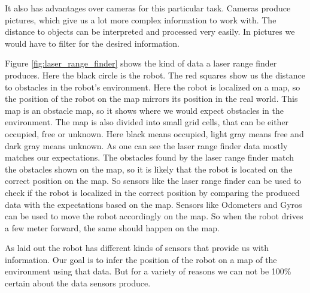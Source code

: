 It also has advantages over cameras for this particular task. Cameras produce pictures, which give us a lot more complex information to work with. The distance to objects can be interpreted and processed very easily. In pictures we would have to filter for the desired information. 

Figure \ref{fig:laser_range_finder} shows the kind of data a laser range finder produces. Here the black circle is the robot. The red squares show us the distance to obstacles in the robot's environment. Here the robot is localized on a map, so the position of the robot on the map mirrors its position in the real world. This map is an obstacle map, so it shows where we would expect obstacles in the environment. The map is also divided into small grid cells, that can be either occupied, free or unknown. Here black means occupied, light gray means free and dark gray means unknown. As one can see the laser range finder data mostly matches our expectations. The obstacles found by the laser range finder match the obstacles shown on the map, so it is likely that the robot is located on the correct position on the map. So sensors like the laser range finder can be used to check if the robot is localized in the correct position by comparing the produced data with the expectations based on the map. Sensors like \glspl{Odometer} and \glspl{Gyro} can be used to move the robot accordingly on the map. So when the robot drives a few meter forward, the same should happen on the map. 

As laid out the robot has different kinds of sensors that provide us with information. Our goal is to infer the position of the robot on a map of the environment using that data. But for a variety of reasons we can not be 100\% certain about the data sensors produce.

